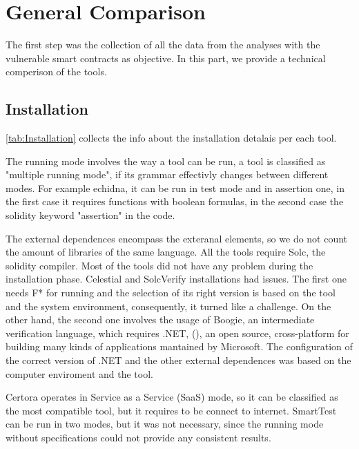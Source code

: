 \section{General Comparison}

The first step was the collection of all the data from the analyses with the vulnerable smart contracts as objective. 
In this part, we provide a technical comperison of the tools. 


\subsection{Installation} 
\autoref{tab:Installation} collects the info about the installation detalais per each tool. 

The running mode involves the way a tool can be run, a tool is classified as "multiple running mode", if its grammar effectivly changes between different modes. For example echidna, it can be run in 
test mode and in assertion one, in the first case it requires functions with boolean formulas, in the second case the solidity keyword "assertion" in the code.

The external dependences encompass the exteranal elements, so we do not count the amount of libraries of the same language. 
All the tools require Solc, the solidity compiler. 
Most of the tools did not have any problem during the installation phase. Celestial and SolcVerify installations had issues.  
The first one needs F* for running and the selection of its right version is
based on the tool and the system environment, consequently, it turned like a challenge. 
On the other hand, the second one involves the usage of Boogie, an intermediate verification language, which requires .NET, (\cite{NET}), 
an open source, cross-platform for building many kinds of applications mantained by Microsoft. 
The configuration of the correct version of .NET and the other external dependences was based on the computer enviroment and the tool. 

Certora operates in Service as a Service (SaaS) mode, so it can be classified as the most compatible tool, but it requires to be connect to internet.
SmartTest can be run in two modes, but it was not necessary, since the running mode without specifications could not provide any consistent results.


